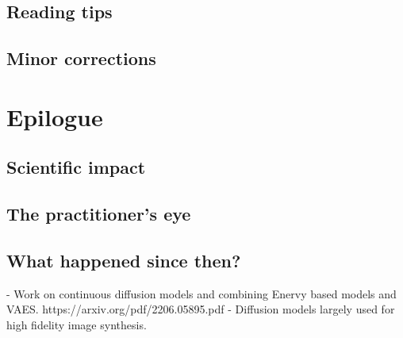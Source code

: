 \subsection{Reading tips}

\subsection{Minor corrections}



\section{Epilogue}
\subsection{Scientific impact}

\subsection{The practitioner's eye}

\subsection{What happened since then?}
- Work on continuous diffusion models and combining Enervy based models and VAES.
https://arxiv.org/pdf/2206.05895.pdf
- Diffusion models largely used for high fidelity image synthesis.
